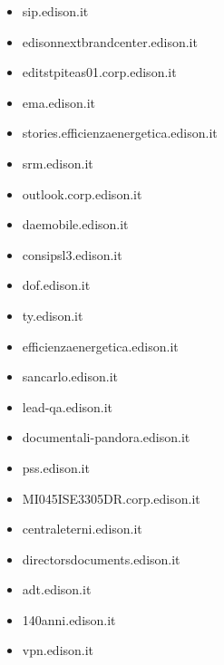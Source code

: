 \documentclass{article}
\begin{document}
\begin{itemize}
        \item sip.edison.it
    
        \item edisonnextbrandcenter.edison.it
    
        \item editstpiteas01.corp.edison.it
    
        \item ema.edison.it
    
        \item stories.efficienzaenergetica.edison.it
    
        \item srm.edison.it
    
        \item outlook.corp.edison.it
    
        \item daemobile.edison.it
    
        \item consipsl3.edison.it
    
        \item dof.edison.it
    
        \item ty.edison.it
    
        \item efficienzaenergetica.edison.it
    
        \item sancarlo.edison.it
    
        \item lead-qa.edison.it
    
        \item documentali-pandora.edison.it
    
        \item pss.edison.it
    
        \item MI045ISE3305DR.corp.edison.it
    
        \item centraleterni.edison.it
    
        \item directorsdocuments.edison.it
    
        \item adt.edison.it
    
        \item 140anni.edison.it
    
        \item vpn.edison.it
    

\end{itemize}
\end{document}
